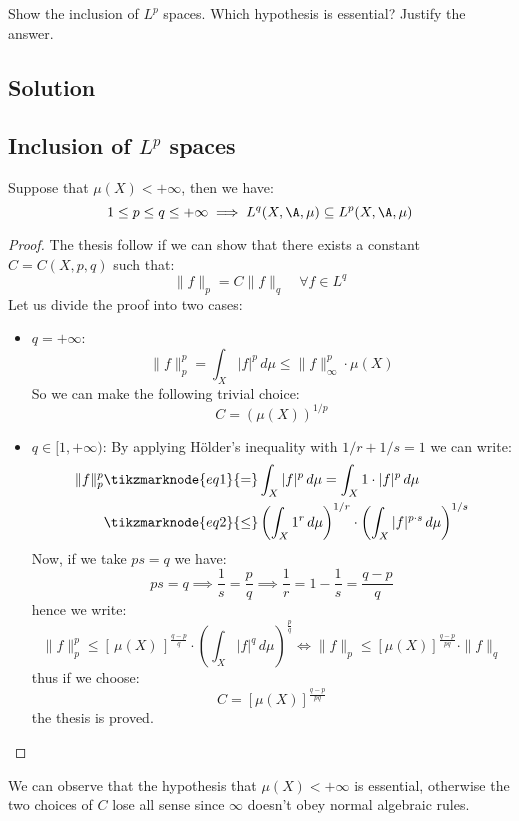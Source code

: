 \sheet


\question
Show the inclusion of $L^p$ spaces. Which hypothesis is essential? Justify the answer.

\subsection*{Solution}

\subsection{Inclusion of \texorpdfstring{$L^p$}{Lp} spaces}
Suppose that $\mu(X)<+\infty$, then we have:
\[ 1\leq p \leq q \leq +\infty \implies L^q(X,\A,\mu) \subseteq L^p(X,\A,\mu) \]

\begin{proof}
    The thesis follow if we can show that there exists a constant $C=C(X,p,q)$ such that:
    \[ \|f\|_p = C \|f\|_q \quad \forall f  \in L^q\]
    Let us divide the proof into two cases:
    \begin{itemize}
        \item $q=+\infty$:
            \[ \|f\|_p^p = \int_X |f|^p \, d\mu \leq \|f\|_\infty^p \cdot \mu(X) \]
            So we can make the following trivial choice:
            \[ C = ( \mu(X) )^{1/p} \]
        \item $q\in[1,+\infty)$:
            By applying Hölder's inequality  with $1/r + 1/s = 1$ we can write:
            \begin{align*}
                \|f\|_p^p &\tikzmarknode{eq1}{=} \int_X |f|^p \, d\mu = \int_X 1\cdot|f|^p \, d\mu \\
                & \tikzmarknode{eq2}{\leq} \left( \int_X 1^r \, d\mu \right)^{1/r} \cdot \left( \int_X |f|^{p\cdot s} \, d\mu \right)^{1/s} \\
            \end{align*}
            Now, if we take $ps=q$ we have:
            \[ ps=q \implies \frac{1}{s} = \frac{p}{q} \implies \frac{1}{r} = 1 - \frac{1}{s} = \frac{q-p}{q}\]
            hence we write:
            \[ \|f\|_p^p \leq [ \, \mu(X) \, ]^{\frac{q-p}{q}} \cdot \left( \int_X |f|^q \, d\mu \right)^{\frac{p}{q}} \iff \|f\|_p \leq [ \mu(X) ]^{\frac{q-p}{pq}} \cdot \|f\|_q \]
            thus if we choose:
            \[ C = [ \mu(X) ]^{\frac{q-p}{pq}} \]
            the thesis is proved.
    \end{itemize}
\end{proof}
We can observe that the hypothesis that $\mu(X)<+\infty$ is essential, otherwise the two choices of $C$ lose all sense since $\infty$ doesn't obey normal algebraic rules.

